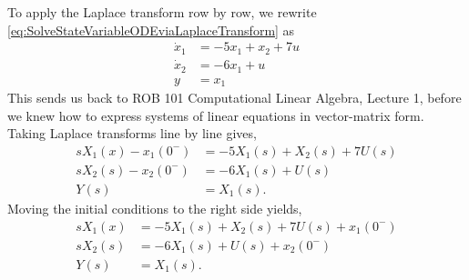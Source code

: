 To apply the Laplace transform row by row, we rewrite \eqref{eq:SolveStateVariableODEviaLaplaceTransform} as
\begin{equation}
    \label{eq:SolveStateVariableODEviaLaplaceTransformRowByRow}
    \begin{aligned}
    \dot{x}_1 & = -5 x_1 + x_2 + 7 u\\
    \dot{x}_2 & = -6 x_1 + u \\
    y & = x_1
    \end{aligned}
\end{equation}
This sends us back to ROB 101 Computational Linear Algebra, Lecture 1, before we knew how to express systems of linear equations in vector-matrix form. Taking Laplace transforms line by line gives,
\begin{equation}
    \label{eq:SolveStateVariableODEviaLaplaceTransformRowByRow02}
    \begin{aligned}
    sX_1(x) - x_1(0^-)& =-5 X_1(s) + X_2(s) + 7 U(s)\\
    sX_2(s) - x_2(0^-) & = -6 X_1(s) + U(s) \\
    Y(s)& = X_1(s).
    \end{aligned}
\end{equation}
Moving the initial conditions to the right side yields,
\begin{equation}
    \label{eq:SolveStateVariableODEviaLaplaceTransformRowByRow03}
    \begin{aligned}
    sX_1(x)& = -5 X_1(s) + X_2(s) + 7 U(s) +  x_1(0^-)\\
    sX_2(s) & =-6 X_1(s) + U(s) + x_2(0^-) \\
    Y(s)& = X_1(s).
    \end{aligned}
\end{equation}

